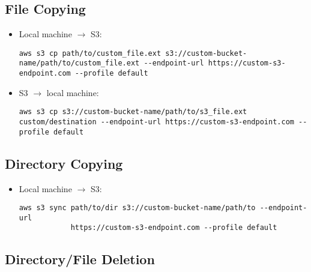 \documentclass[12pt, a4paper]{scrbook}
\numberwithin{equation}{section}
\theoremstyle{definition}
\theoremstyle{definition}
\begin{document}
	\subsection{File Copying}
	
	\begin{itemize}
		\item Local machine $\longrightarrow$ S3:
		
		\begin{lstlisting}[style=mystylebash, label=alg:aws__file_copying_local_s3, xleftmargin=\parindent]
			aws s3 cp path/to/custom_file.ext s3://custom-bucket-name/path/to/custom_file.ext --endpoint-url https://custom-s3-endpoint.com --profile default
		\end{lstlisting}	
		
		\item S3 $\longrightarrow$ local machine:
		
		\begin{lstlisting}[style=mystylebash, label=alg:aws__file_copying_s3_local, xleftmargin=\parindent]
			aws s3 cp s3://custom-bucket-name/path/to/s3_file.ext custom/destination --endpoint-url https://custom-s3-endpoint.com --profile default
		\end{lstlisting}	
	\end{itemize}
	
	\subsection{Directory Copying}
	
	\begin{itemize}
		\item Local machine $\longrightarrow$ S3:
		
		\begin{lstlisting}[style=mystylebash, label=alg:aws__dir_copying, xleftmargin=\parindent]
			aws s3 sync path/to/dir s3://custom-bucket-name/path/to --endpoint-url      
			https://custom-s3-endpoint.com --profile default
		\end{lstlisting}
		
	\end{itemize}
	
	\subsection{Directory/File Deletion}
	
\end{document}
